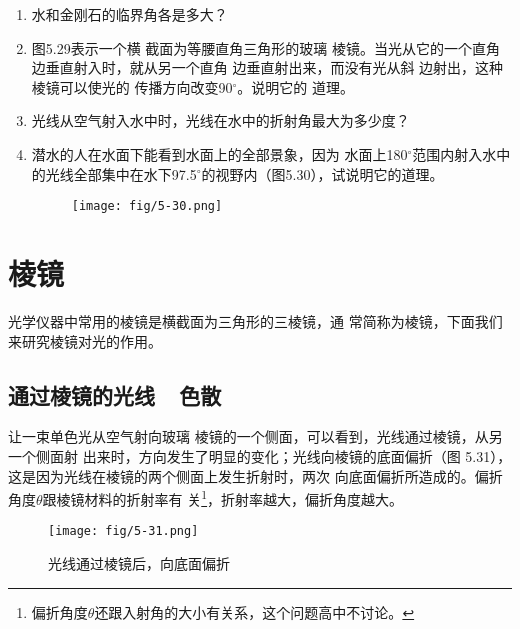 \begin{enumerate}
    \item 水和金刚石的临界角各是多大？
    \item 图5.29表示一个横
截面为等腰直角三角形的玻璃
棱镜。当光从它的一个直角边垂直射入时，就从另一个直角
边垂直射出来，而没有光从斜
边射出，这种棱镜可以使光的
传播方向改变90$^\circ$。说明它的
道理。
\begin{figure}[htp]
	\centering
{}
	\caption{}
\end{figure}

\item 光线从空气射入水中时，光线在水中的折射角最大为多少度？
\item 潜水的人在水面下能看到水面上的全部景象，因为
水面上180$^\circ$范围内射入水中的光线全部集中在水下97.5$^\circ$的视野内（图5.30），试说明它的道理。
\begin{figure}[htp]\centering
    \texttt{[image: fig/5-30.png]}
    \caption{}
    \end{figure}
\end{enumerate}

\section{棱镜}

光学仪器中常用的棱镜是横截面为三角形的三棱镜，通
常简称为棱镜，下面我们来研究棱镜对光的作用。

\subsection{通过棱镜的光线~~色散}

让一束单色光从空气射向玻璃
棱镜的一个侧面，可以看到，光线通过棱镜，从另一个侧面射
出来时，方向发生了明显的变化；光线向棱镜的底面偏折（图
5.31），这是因为光线在棱镜的两个侧面上发生折射时，两次
向底面偏折所造成的。偏折角度$\theta$跟棱镜材料的折射率有
关\footnote{偏折角度$\theta$还跟入射角的大小有关系，这个问题高中不讨论。}，折射率越大，偏折角度越大。
\begin{figure}[htp]\centering
    \texttt{[image: fig/5-31.png]}
    \caption{光线通过棱镜后，向底面偏折}
    \end{figure}

